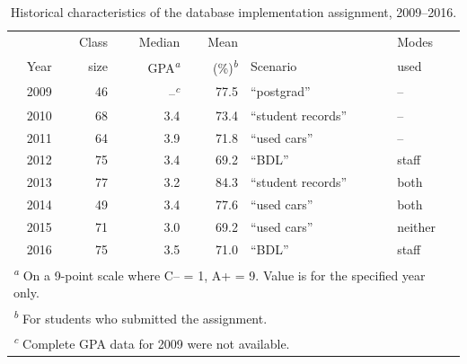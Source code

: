 \documentclass[sigconf, authordraft, capitalise]{acmart}
\begin{document}
\begin{table}
    \caption{Historical characteristics of the database implementation assignment, 2009--2016.}
    \label{tab-data}
    \begin{tabular}{rrrrll}
        \toprule
                &   Class   &   Median                          &   Mean                            &               &   Modes   \\
        Year    &   size    &   GPA\textsuperscript{\emph{a}}   &   (\%)\textsuperscript{\emph{b}}  &   Scenario    &   used    \\
        \midrule
        2009    &   46  &   --\textsuperscript{\emph{c}} &   77.5    &   ``postgrad''        &   --  \\
        2010    &   68  &   3.4 &   73.4    &   ``student records'' &   --  \\
        2011    &   64  &   3.9 &   71.8    &   ``used cars''       &   --  \\
        \midrule
        2012    &   75  &   3.4 &   69.2    &   ``BDL''             &   staff   \\
        2013    &   77  &   3.2 &   84.3    &   ``student records'' &   both \\
        \midrule
        2014    &   49  &   3.4 &   77.6    &   ``used cars''       &   both \\
        2015    &   71  &   3.0 &   69.2    &   ``used cars''       &   neither  \\
        2016    &   75  &   3.5 &   71.0    &   ``BDL''             &   staff   \\
        \bottomrule
        \multicolumn{6}{l}{\footnotesize \textsuperscript{\emph{a}} On a 9-point scale where C-- = 1, A+ = 9. Value is for the specified year only.}    \\
        \multicolumn{6}{l}{\footnotesize \textsuperscript{\emph{b}} For students who submitted the assignment.}    \\
        \multicolumn{6}{l}{\footnotesize \textsuperscript{\emph{c}} Complete GPA data for 2009 were not available.}    \\
    \end{tabular}
\end{table}
\end{document}
